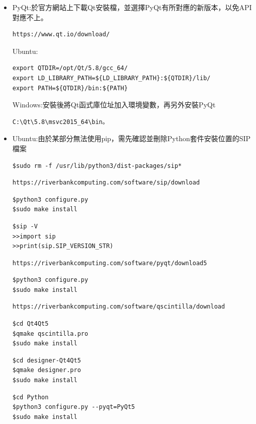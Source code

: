 \documentclass[14pt,a4paper]{report}  %
\begin{document}
	\begin{itemize}
		\item PyQt:於官方網站上下載Qt安裝檔，並選擇PyQt有所對應的新版本，以免API對應不上。
		\begin{lstlisting}[caption=下載Qt檔]
https://www.qt.io/download/
		\end{lstlisting}
		Ubuntu:\\
		\begin{lstlisting}[caption=安裝後將Qt函式庫位址加入~/.bashrc環境變數]
export QTDIR=/opt/Qt/5.8/gcc_64/
export LD_LIBRARY_PATH=${LD_LIBRARY_PATH}:${QTDIR}/lib/
export PATH=${QTDIR}/bin:${PATH}
		\end{lstlisting}
		Windows:安裝後將Qt函式庫位址加入環境變數，再另外安裝PyQt\\
		\begin{lstlisting}[caption=Qt函式庫位址加入環境變數]
C:\Qt\5.8\msvc2015_64\bin。
		\end{lstlisting}
		\end{itemize}       
      
     \begin{itemize}
		\item Ubuntu:由於某部分無法使用pip，需先確認並刪除Python套件安裝位置的SIP檔案
		\begin{lstlisting}[caption=刪除SIP檔案]
$sudo rm -f /usr/lib/python3/dist-packages/sip*
		\end{lstlisting}
		\begin{lstlisting}[caption=下載新版SIP]
https://riverbankcomputing.com/software/sip/download
		\end{lstlisting}
		\begin{lstlisting}[caption=解壓縮後安裝]
$python3 configure.py
$sudo make install
		\end{lstlisting}
		\begin{lstlisting}[caption=核對Python內的版本]
$sip -V
>>import sip
>>print(sip.SIP_VERSION_STR)
		\end{lstlisting}
		\begin{lstlisting}[caption=下載新版PyQt5]
https://riverbankcomputing.com/software/pyqt/download5
		\end{lstlisting}
		\begin{lstlisting}[caption=解壓縮後安裝]
$python3 configure.py
$sudo make install
		\end{lstlisting}
		\begin{lstlisting}[caption=下載新版的QScintilla 2]
https://riverbankcomputing.com/software/qscintilla/download
		\end{lstlisting}
		
		\begin{lstlisting}[caption=本體]
$cd Qt4Qt5
$qmake qscintilla.pro
$sudo make install
		\end{lstlisting}
		\begin{lstlisting}[caption=Designer]
$cd designer-Qt4Qt5
$qmake designer.pro
$sudo make install
		\end{lstlisting}
		\begin{lstlisting}[caption=Python bundings]
$cd Python
$python3 configure.py --pyqt=PyQt5
$sudo make install
		\end{lstlisting}
		\end{itemize}  
		     
\end{document}
